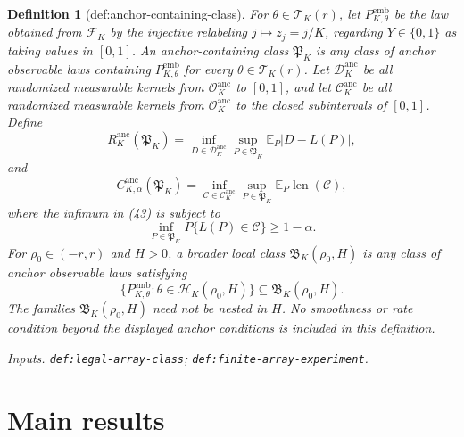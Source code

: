 \documentclass{article}
\newtheorem{definition}{Definition}
\begin{document}
\begin{definition}[def:anchor-containing-class]
For \(\theta\in\mathcal T_K(r)\), let
\(P_{K,\theta}^{\mathrm{emb}}\) be the law obtained from
\(\mathcal F_K\) by the injective relabeling \(j\mapsto z_j=j/K\),
regarding \(Y\in\{0,1\}\) as taking values in \([0,1]\).  An
anchor-containing class \(\mathfrak P_K\) is any class of anchor
observable laws containing \(P_{K,\theta}^{\mathrm{emb}}\) for every
\(\theta\in\mathcal T_K(r)\).  Let
\(\mathscr D_K^{\mathrm{anc}}\) be all randomized measurable kernels
from \(\mathcal O_K^{\mathrm{anc}}\) to \([0,1]\), and let
\(\mathscr C_K^{\mathrm{anc}}\) be all randomized measurable kernels
from \(\mathcal O_K^{\mathrm{anc}}\) to the closed subintervals of
\([0,1]\).  Define
\[
 R_K^{\mathrm{anc}}(\mathfrak P_K)
 =
 \inf_{D\in\mathscr D_K^{\mathrm{anc}}}
 \sup_{P\in\mathfrak P_K}\mathbb E_P|D-L(P)|,
 \tag{42}
\]
and
\[
 C_{K,\alpha}^{\mathrm{anc}}(\mathfrak P_K)
 =
 \inf_{\mathcal C\in\mathscr C_K^{\mathrm{anc}}}
 \sup_{P\in\mathfrak P_K}
 \mathbb E_P\operatorname{len}(\mathcal C),
 \tag{43}
\]
where the infimum in (43) is subject to
\[
 \inf_{P\in\mathfrak P_K}
 P\{L(P)\in\mathcal C\}\ge1-\alpha.
 \tag{44}
\]
For \(\rho_0\in(-r,r)\) and \(H>0\), a broader local class
\(\mathfrak B_K(\rho_0,H)\) is any class of anchor observable laws
satisfying
\[
 \{P_{K,\theta}^{\mathrm{emb}}:
   \theta\in\mathcal H_K(\rho_0,H)\}
 \subseteq\mathfrak B_K(\rho_0,H).
 \tag{45}
\]
The families \(\mathfrak B_K(\rho_0,H)\) need not be nested in \(H\).
No smoothness or rate condition beyond the displayed anchor conditions
is included in this definition.
\par\smallskip\noindent\emph{Inputs.} \texttt{def:\allowbreak{}legal-\allowbreak{}array-\allowbreak{}class}; \texttt{def:\allowbreak{}finite-\allowbreak{}array-\allowbreak{}experiment}.
\end{definition}

\section{Main results}
\end{document}
